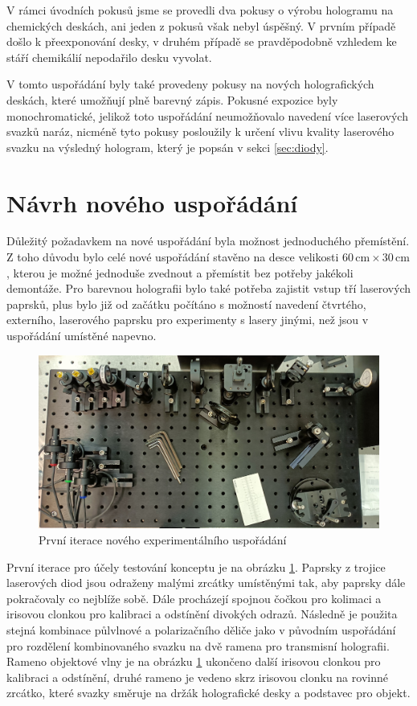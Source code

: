 \documentclass[twoside,project]{../MFFPrace}
\begin{document}
\medskip

V rámci úvodních pokusů jsme se provedli dva pokusy o výrobu hologramu na chemických deskách, ani jeden z pokusů však nebyl úspěšný. V prvním případě došlo k přeexponování desky, v druhém případě se pravděpodobně vzhledem ke stáří chemikálií nepodařilo desku vyvolat.

V tomto uspořádání byly také provedeny pokusy na nových holografických deskách, které umožňují plně barevný zápis. Pokusné expozice byly monochromatické, jelikož toto uspořádání neumožňovalo navedení více laserových svazků naráz, nicméně tyto pokusy posloužily k určení vlivu kvality laserového svazku na výsledný hologram, který je popsán v sekci \ref{sec:diody}.


\section{Návrh nového uspořádání}
Důležitý požadavkem na nové uspořádání byla možnost jednoduchého přemístění. Z toho důvodu bylo celé nové uspořádání stavěno na desce velikosti $60\,\text{cm}\times30\,\text{cm}$, kterou je možné jednoduše zvednout a přemístit bez potřeby jakékoli demontáže. Pro barevnou holografii bylo také potřeba zajistit vstup tří laserových paprsků, plus bylo již od začátku počítáno s možností navedení čtvrtého, externího, laserového paprsku pro experimenty s lasery jinými, než jsou v uspořádání umístěné napevno.

\begin{figure}
    \includegraphics[width=\linewidth]{../img/nove-usporadani-prvni.jpg}
    \caption{První iterace nového experimentálního uspořádání}
    \label{img:prvni-iterace}
\end{figure}

První iterace pro účely testování konceptu je na obrázku \ref{img:prvni-iterace}. Paprsky z trojice laserových diod jsou odraženy malými zrcátky umístěnými tak, aby paprsky dále pokračovaly co nejblíže sobě. Dále procházejí spojnou čočkou pro kolimaci a irisovou clonkou pro kalibraci a odstínění divokých odrazů. Následně je použita stejná kombinace půlvlnové a polarizačního děliče jako v původním uspořádání pro rozdělení kombinovaného svazku na dvě ramena pro transmisní holografii. Rameno objektové vlny je na obrázku \ref{img:prvni-iterace} ukončeno další irisovou clonkou pro kalibraci a odstínění, druhé rameno je vedeno skrz irisovou clonku na rovinné zrcátko, které svazky směruje na držák holografické desky a podstavec pro objekt.
\end{document}
